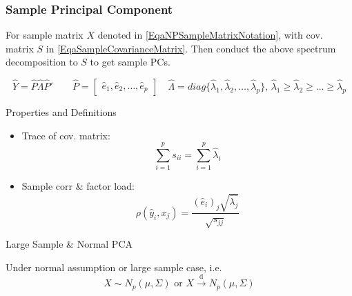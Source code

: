     
\subsubsection{Sample Principal Component}
    For sample matrix $ X $ denoted in \autoref{EqaNPSampleMatrixNotation}, with cov. matrix $ S $ in \autoref{EqaSampleCovarianceMatrix}. Then conduct the above spectrum decomposition to $ S $ to get sample PCs.

    
    \begin{equation}
        \hat{Y}=\hat{P}\hat{\Lambda }\hat{P}' \qquad \hat{P}=\begin{bmatrix}
            \hat{e}_1,\hat{e}_2,\ldots,\hat{e}_p
        \end{bmatrix} 
        \quad \hat{\Lambda} =diag\{\hat{\lambda} _1,\hat{\lambda} _2,\ldots,\hat{\lambda} _p\},\, \hat{\lambda} _1\geq\hat{\lambda} _2\geq\ldots\geq\hat{\lambda} _p
    \end{equation}
    
    Properties and Definitions 
    \begin{itemize}[topsep=2pt,itemsep=2pt]
        \item Trace of cov. matrix:
        \begin{equation}
            \sum_{i=1}^ps _{ii}=\sum_{i=1}^p\hat{\lambda}_i
        \end{equation}
        
        
        \item Sample corr \& factor load:
        \begin{equation}
             \rho (\hat{y}_i,x_j)=\dfrac{(\hat{e}_{i})_j\sqrt{\hat{\lambda _j}}}{\sqrt{s_{jj}}}
        \end{equation}
    \end{itemize}
    
    \begin{point}
        Large Sample \& Normal PCA
    \end{point}
    
    Under normal assumption or large sample case, i.e. 
    \begin{equation}
        X\sim N_p(\mu,\Sigma ) \text{ or } X\xrightarrow[]{\mathrm{d}} N_p(\mu,\Sigma )
    \end{equation}
    
